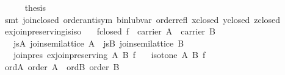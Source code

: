 \begin{isabellebody}
\ \ \ \ \isamarkupfalse%
\ {}thesis\isanewline
\ \ \ \ \ \ \isamarkupfalse%
\ {}smt\ join{}closed\ order{}antisym\ bin{}lub{}var\ order{}refl\ x{}closed\ y{}closed\ z{}closed{}\isanewline
\ \ \isamarkupfalse%
%
\endisatagproof
{\isafoldproof}%
%
\isadelimproof
\isanewline
%
\endisadelimproof
\isanewline
{}\isamarkupfalse%
\isanewline
\isanewline
{}\isamarkupfalse%
\ ex{}join{}preserving{}is{}iso{}\isanewline
\ \ \ f{}closed{}\ {}f\ {}\ carrier\ A\ {}\ carrier\ B{}\isanewline
\ \ \ js{}A{}\ {}join{}semilattice\ A{}\ \ js{}B{}\ {}join{}semilattice\ B{}\isanewline
\ \ \ join{}pres{}\ {}ex{}join{}preserving\ A\ B\ f{}\isanewline
\ \ \ {}isotone\ A\ B\ f{}\isanewline
%
\isadelimproof
%
\endisadelimproof
%
\isatagproof
{}\isamarkupfalse%
\ {}\isanewline
\isanewline
\ \ \isamarkupfalse%
\ ord{}A{}\ {}order\ A{}\ \ ord{}B{}\ {}order\ B{}\isanewline

\end{isabellebody}
